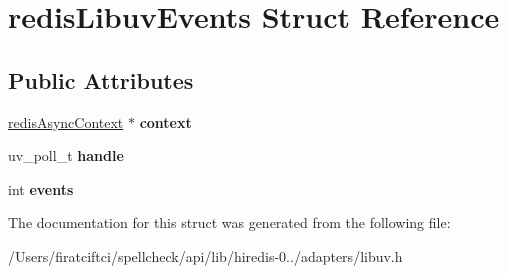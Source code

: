 \hypertarget{structredis_libuv_events}{}\section{redis\+Libuv\+Events Struct Reference}
\label{structredis_libuv_events}
\subsection*{Public Attributes}
\begin{DoxyCompactItemize}
\item 
\mbox{\label{structredis_libuv_events_a328dc1ba61c651da9e658bce18959fa8}} 
\mbox{\hyperlink{structredis_async_context}{redis\+Async\+Context}} $\ast$ {\bfseries context}
\item 
\mbox{\label{structredis_libuv_events_a27ac1174695e3b6089233f3094c04e6e}} 
uv\+\_\+poll\+\_\+t {\bfseries handle}
\item 
\mbox{\label{structredis_libuv_events_ae1c36a588f0f5c27c2244673532457aa}} 
int {\bfseries events}
\end{DoxyCompactItemize}


The documentation for this struct was generated from the following file\+:\begin{DoxyCompactItemize}
\item 
/\+Users/firatciftci/spellcheck/api/lib/hiredis-\/0../adapters/libuv.\+h\end{DoxyCompactItemize}
